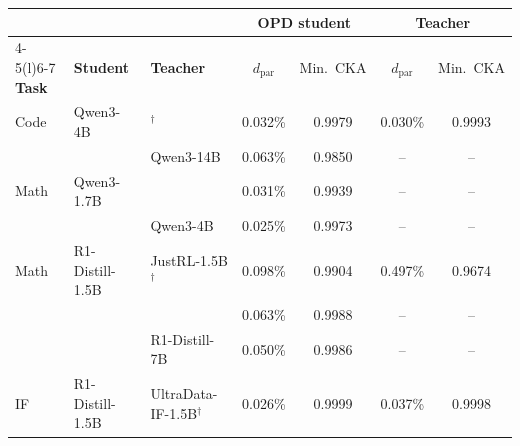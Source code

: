 \begin{tabular}{@{}lllcccc@{}}
\toprule
 & & & \multicolumn{2}{c}{\textbf{OPD student}} & \multicolumn{2}{c}{\textbf{Teacher}} \\
\cmidrule(lr){4-5}\cmidrule(l){6-7}
\textbf{Task} & \textbf{Student} & \textbf{Teacher}
 & $d_{\mathrm{par}}$ & Min.\ CKA & $d_{\mathrm{par}}$ & Min.\ CKA \\
\midrule
Code & Qwen3-4B & \QwenRLCode{}$^{\dagger}$ & 0.032\% & 0.9979 & 0.030\% & 0.9993 \\
     &          & Qwen3-14B                 & 0.063\% & 0.9850 & --      & --     \\
\midrule
Math & Qwen3-1.7B & \QwenRLMath{}          & 0.031\% & 0.9939 & --      & --     \\
     &            & Qwen3-4B                  & 0.025\% & 0.9973 & --      & --     \\
\midrule
Math & R1-Distill-1.5B & JustRL-1.5B$^{\dagger}$       & 0.098\% & 0.9904 & 0.497\% & 0.9674 \\
     &                 & \SkyworkTeacher{}             & 0.063\% & 0.9988 & --      & --     \\
     &                 & R1-Distill-7B                 & 0.050\% & 0.9986 & --      & --     \\
\midrule
IF   & R1-Distill-1.5B & UltraData-IF-1.5B$^{\dagger}$ & 0.026\% & 0.9999 & 0.037\% & 0.9998 \\
\bottomrule
\end{tabular}
